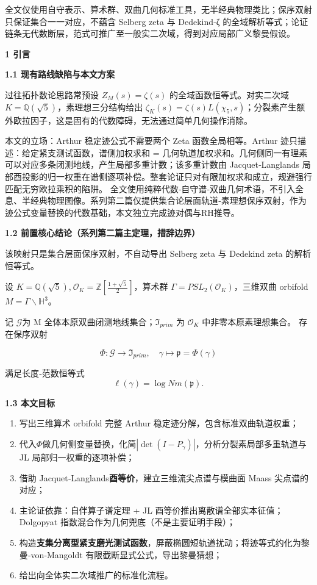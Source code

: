 \documentclass[11pt,a4paper]{ctexart}
\begin{document}
全文仅使用自守表示、算术群、双曲几何标准工具，无半经典物理类比；保序双射只保证集合一一对应，不蕴含
Selberg zeta 与 Dedekind‑ζ
的全域解析等式；论证链条无代数断层，范式可推广至一般实二次域，得到对应局部广义黎曼假设。

\textbf{1 引言}

\textbf{1.1 现有路线缺陷与本文方案}

过往拓扑数论思路常预设 \(Z_{M}(s) = \zeta(s)\)
的全域函数恒等式。对实二次域
\(K = \mathbb{Q}\left( \sqrt{5} \right)\)，素理想三分结构给出
\(\zeta_{K}(s) = \zeta(s)L\left( \chi_{5},s \right)\)；分裂素产生额外欧拉因子，这是固有的代数障碍，无法通过简单几何操作消除。

本文的立场：Arthur 稳定迹公式不需要两个 Zeta 函数全局相等。Arthur
迹只描述：给定紧支测试函数，谱侧加权求和 =
几何轨道加权求和。几何侧同一有理素可以对应多条闭测地线，产生局部多重计数；该多重计数由
Jacquet‑Langlands
局部酉投影的归一权重在谱侧逐项补偿。整套论证只对有限加权求和成立，规避强行匹配无穷欧拉乘积的陷阱。
全文使用纯粹代数‑自守谱‑双曲几何术语，不引入全息、半经典物理图像。系列第二篇仅提供集合论层面轨道‑素理想保序双射，作为迹公式变量替换的代数基础，本文独立完成迹对偶与RH推导。

\textbf{1.2 前置核心结论（系列第二篇主定理，措辞边界）}

该映射只是集合层面保序双射，不自动导出 Selberg zeta 与 Dedekind zeta
的解析恒等式。

设
\(K = \mathbb{Q}\left( \sqrt{5} \right)\),\(\ \mathcal{O}_{K} = \mathbb{Z}\left\lbrack \frac{1 + \sqrt{5}}{2} \right\rbrack\)，算术群
\(\Gamma = {PSL}_{2}\left( \mathcal{O}_{K} \right)\)，三维双曲 orbifold
\(M = \Gamma\backslash\mathbb{H}^{3}\)。

记 \(\mathcal{G}\)为 M 全体本原双曲闭测地线集合；\(\mathfrak{I}_{prim}\)
为 \(\mathcal{O}_{K}\) 中非零本原素理想集合。 存在保序双射

\[\Phi:\mathcal{G} \rightarrow \mathfrak{I}_{prim},\quad\gamma \mapsto \mathfrak{p} = \Phi(\gamma)\]

满足长度‑范数恒等式
\[
\ell\left(\gamma\right)= \log{Nm}\left( \mathfrak{p} \right).
\]

\textbf{1.3 本文目标}

\begin{enumerate}
\def\labelenumi{\arabic{enumi}.}
\item
  写出三维算术 orbifold 完整 Arthur 稳定迹分解，包含标准双曲轨道权重；
\item
  代入\(\Phi\)做几何侧变量替换，化简\(\left| \det\left( I - P_{\gamma} \right) \right|\)，分析分裂素局部多重轨道与
  JL 局部归一权重的逐项补偿；
\item
  借助 Jacquet‑Langlands\textbf{酉等价}，建立三维流尖点谱与模曲面 Maass
  尖点谱的对应；
\item
  主论证依靠：自伴算子谱定理 + JL
  酉等价推出离散谱全部实本征值；Dolgopyat
  指数混合作为几何兜底（不是主要证明手段）；
\item
  构造\textbf{支集分离型紧支磨光测试函数}，屏蔽椭圆短轨道扰动；将迹等式约化为黎曼‑von‑Mangoldt
  有限截断显式公式，导出黎曼猜想；
\item
  给出向全体实二次域推广的标准化流程。
\end{enumerate}
\end{document}
